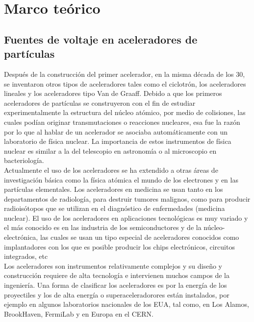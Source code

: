 

\chapter{Marco teórico}
\section{Fuentes de voltaje en aceleradores de partículas}

Después de la construcción del primer acelerador, en la misma década de los
30, se inventaron otros tipos de aceleradores tales como el ciclotrón, los
aceleradores lineales y los aceleradores tipo Van de Graaff. Debido a que los
primeros aceleradores de partículas se construyeron con el fin de estudiar
experimentalmente la estructura del núcleo atómico, por medio de colisiones, las cuales podían originar transmutaciones o reacciones nucleares, esa fue la razón por lo que al hablar de un acelerador se asociaba automáticamente con un laboratorio de física nuclear. La importancia de estos instrumentos de física nuclear es similar a la del telescopio en astronomía o al microscopio en bacteriología.\\

Actualmente el uso de los aceleradores se ha extendido a otras áreas de investigación básica como la física atómica el mundo de los electrones y en las partículas elementales. Los aceleradores en medicina se usan tanto en los departamentos de radiología, para destruir tumores malignos, como para producir radioisótopos que se utilizan en el diagnóstico de enfermedades (medicina nuclear). El uso de los aceleradores en aplicaciones tecnológicas es muy variado y el más conocido es en las industria de los semiconductores y de la núcleo-electrónica, las cuales se usan un tipo especial de aceleradores conocidos como implantadores con los que es posible producir los chips electrónicos, circuitos integrados, etc\\

Los aceleradores son instrumentos relativamente complejos y su diseño y construcción requiere de alta tecnología e intervienen muchos campos de la ingeniería. Una forma de clasificar los aceleradores es por la energía de los proyectiles y los de alta energía o superaceleradorores están instalados, por ejemplo en algunos laboratorios nacionales de los EUA, tal como, en Los Alamos,
BrookHaven, FermiLab y en Europa en el CERN. \\


